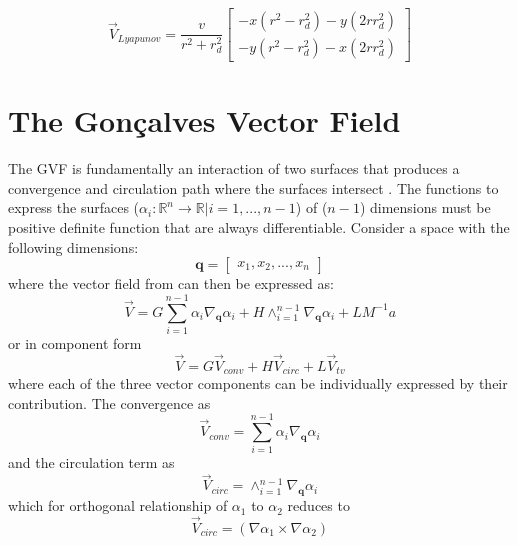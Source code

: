 \documentclass[conf]{new-aiaa}
\begin{document}
\begin{equation}\label{eq:lyapunovvf}
\overrightarrow{V}_{Lyapunov} = \frac{v}{r^2+r_d^2} \begin{bmatrix} -x (r^2-r_d^2) - y (2 r r_d^2) \\ -y (r^2-r_d^2) - x (2 r r_d^2)\end{bmatrix}
\end{equation}

\section{The Gon\c{c}alves Vector Field}
The GVF is fundamentally an interaction of two surfaces that produces a convergence and circulation path where the surfaces intersect {\cite{goncalves_circulation_2010,goncalves_artificial_2009,goncalves_vector_2010,goncalves_coordination_2013}}. The functions to express the surfaces ($\alpha_i:\mathbb{R}^n\rightarrow\mathbb{R} | i=1,...,n-1$) of ($n-1$) dimensions must be positive definite function that are always differentiable. Consider a space with the following dimensions:
\begin{equation}
\mathbf{q} = \begin{bmatrix} x_1, x_2, ..., x_{n}\end{bmatrix}
\end{equation}
where the vector field from \cite{goncalves_circulation_2010} can then be expressed as:
\begin{equation}
\overrightarrow{V} = G  \sum_{i=1}^{n-1} \alpha_i \nabla_\mathbf{q} \alpha_i + H \wedge_{i=1}^{n-1} \nabla_\mathbf{q} \alpha_i + L M^{-1}a
\end{equation}
or in component form
\begin{equation}\label{eq:vfcomponent}
\overrightarrow{V} = G \overrightarrow{V}_{conv} + H \overrightarrow{V}_{circ} + L \overrightarrow{V}_{tv}
\end{equation}
where each of the three vector components can be individually expressed by their contribution. The convergence as
\begin{equation}
\overrightarrow{V}_{conv} =  \sum_{i=1}^{n-1} \alpha_i \nabla_\mathbf{q} \alpha_i
\end{equation}
and the circulation term as
\begin{equation}
\overrightarrow{V}_{circ} =  \wedge_{i=1}^{n-1} \nabla_\mathbf{q} \alpha_i
\end{equation}
which for orthogonal relationship of $\alpha_1$ to $\alpha_2$ reduces to 
\begin{equation}
\overrightarrow{V}_{circ} =  \left(\nabla \alpha_1 \times \nabla \alpha_2\right)
\end{equation}
\end{document}
